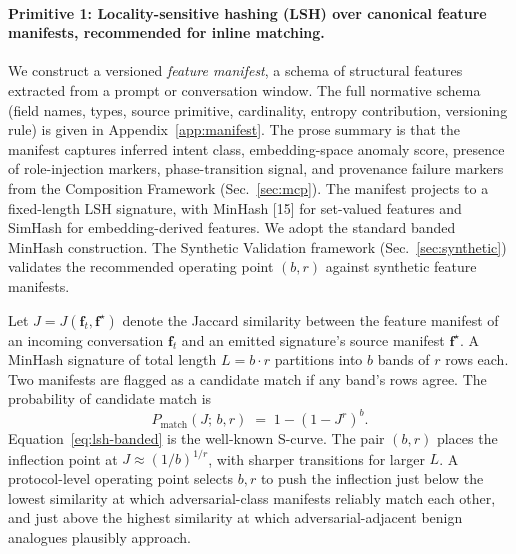 \documentclass[11pt]{article}
\begin{document}
\paragraph{Primitive 1: Locality-sensitive hashing (LSH) over canonical feature manifests, recommended for inline matching.}
We construct a versioned \emph{feature manifest}, a schema of structural features extracted from a prompt or conversation window. The full normative schema (field names, types, source primitive, cardinality, entropy contribution, versioning rule) is given in Appendix~\ref{app:manifest}. The prose summary is that the manifest captures inferred intent class, embedding-space anomaly score, presence of role-injection markers, phase-transition signal, and provenance failure markers from the Composition Framework (Sec.~\ref{sec:mcp}). The manifest projects to a fixed-length LSH signature, with MinHash [15] for set-valued features and SimHash for embedding-derived features. We adopt the standard banded MinHash construction. The Synthetic Validation framework (Sec.~\ref{sec:synthetic}) validates the recommended operating point $(b, r)$ against synthetic feature manifests.

Let $J = J(\mathbf{f}_t, \mathbf{f}^\star)$ denote the Jaccard similarity between the feature manifest of an incoming conversation $\mathbf{f}_t$ and an emitted signature's source manifest $\mathbf{f}^\star$. A MinHash signature of total length $L = b \cdot r$ partitions into $b$ bands of $r$ rows each. Two manifests are flagged as a candidate match if any band's rows agree. The probability of candidate match is
\begin{equation}
P_{\text{match}}(J;\, b, r) \;=\; 1 - (1 - J^{r})^{b}.
\label{eq:lsh-banded}
\end{equation}
Equation~\eqref{eq:lsh-banded} is the well-known S-curve. The pair $(b, r)$ places the inflection point at $J \approx (1/b)^{1/r}$, with sharper transitions for larger $L$. A protocol-level operating point selects $b, r$ to push the inflection just below the lowest similarity at which adversarial-class manifests reliably match each other, and just above the highest similarity at which adversarial-adjacent benign analogues plausibly approach.
\end{document}
